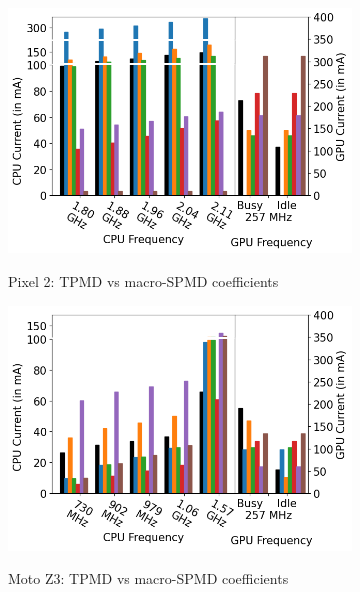 \begin{figure}[tb]
\begin{subfigure}[b]{0.32\textwidth}
         \includegraphics[width=\textwidth]{figures/002_Pixel2_250_5_macro_equations.png}
         \label{fig:macro_equations_p2}
         \vspace{-0.25in}
         \caption{Pixel 2: TPMD vs macro-SPMD coefficients}
     \end{subfigure}
    \begin{subfigure}[b]{0.32\textwidth}
         \centering
         \includegraphics[width=\textwidth]{figures/003_MotoZ3_250_5_macro_equations.png}
         \label{fig:macro_equations_z3}
         \vspace{-0.25in}
         \caption{Moto Z3: TPMD vs macro-SPMD coefficients}
     \end{subfigure}
    \begin{subfigure}[b]{0.32\textwidth}
         \centering

\end{subfigure}
\end{figure}
